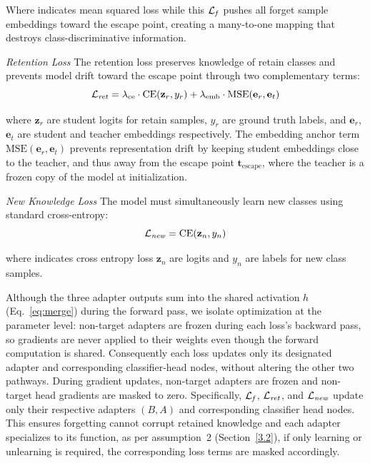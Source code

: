 Where  indicates mean squared loss while this $\mathcal{L}_{\text{\textit{f}}}$ pushes all forget sample embeddings toward the escape point, creating a many-to-one mapping that destroys class-discriminative information.

\medskip
\noindent
\textit{Retention Loss}
The retention loss preserves knowledge of retain classes and prevents model drift toward the escape point through two complementary terms:
\begin{equation}
\mathcal{L}_{\text{\textit{ret}}} = \lambda_{\text{ce}} \cdot \text{CE}(\mathbf{z}_r, y_r) + \lambda_{\text{emb}} \cdot \text{MSE}(\mathbf{e}_r, \mathbf{e}_t)
\end{equation}

where $\mathbf{z}_r$ are student logits for retain samples, $y_r$ are ground truth labels, and $\mathbf{e}_r$, $\mathbf{e}_t$ are student and teacher embeddings respectively. The embedding anchor term $\text{MSE}(\mathbf{e}_r, \mathbf{e}_t)$ prevents representation drift by keeping student embeddings close to the teacher, and thus away from the escape point $\mathbf{t}_{\text{escape}}$, where the teacher is a frozen copy of the model at initialization.

\medskip
\noindent
\textit{New Knowledge Loss}
The model must simultaneously learn new classes using standard cross-entropy:
\begin{equation}
\mathcal{L}_{\text{\textit{new}}} = \text{CE}(\mathbf{z}_n, y_n)
\end{equation}

where  indicates cross entropy loss $\mathbf{z}_n$ are logits and $y_n$ are labels for new class samples. 

Although the three adapter outputs sum into the shared activation $h$ (Eq.~\ref{eq:merge}) during the forward pass, we isolate optimization at the parameter level: non-target adapters are frozen during each loss's backward pass, so gradients are never applied to their weights even though the forward computation is shared. Consequently each loss updates only its designated adapter and corresponding classifier-head nodes, without altering the other two pathways. During gradient updates, non-target adapters are frozen and non-target head gradients are masked to zero. Specifically, $\mathcal{L}_{\text{\textit{f}}}$, $\mathcal{L}_{\text{\textit{ret}}}$, and $\mathcal{L}_{\text{\textit{new}}}$ update only their respective adapters $(B, A)$ and corresponding classifier head nodes. This ensures forgetting cannot corrupt retained knowledge and each adapter specializes to its function, as per assumption~2 (Section~\ref{3.2}), if only learning or unlearning is required, the corresponding loss terms are masked accordingly.


